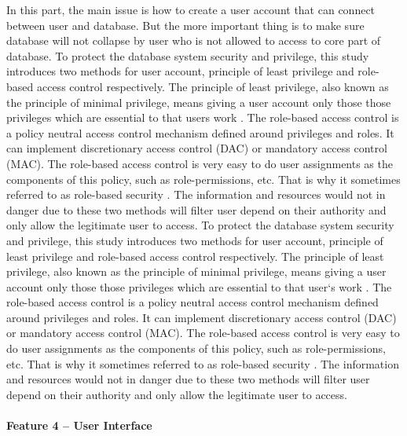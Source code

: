 In this part, the main issue is how to create a user account that can connect between user and database. But the more important thing is to make sure database will not collapse by user who is not allowed to access to core part of database.
To protect the database system security and privilege, this study introduces two methods for user account, principle of least privilege and role-based access control respectively. The principle of least privilege, also known as the principle of minimal privilege, means giving a user account only those those privileges which are essential to that users work \cite{PrincipleLeastPrivilege}. The role-based access control is a policy neutral access control mechanism defined around privileges and roles. It can implement discretionary access control (DAC) or mandatory access control (MAC). The role-based access control is very easy to do user assignments as the components of this policy, such as role-permissions, etc. That is why it sometimes referred to as role-based security \cite{RoleBasedAccessControl}. The information and resources would not in danger due to these two methods will filter user depend on their authority and only allow the legitimate user to access.	
To protect the database system security and privilege, this study introduces two methods for user account, principle of least privilege and role-based access control respectively. The principle of least privilege, also known as the principle of minimal privilege, means giving a user account only those those privileges which are essential to that user`s work \cite{PrincipleLeastPrivilege}. The role-based access control is a policy neutral access control mechanism defined around privileges and roles. It can implement discretionary access control (DAC) or mandatory access control (MAC). The role-based access control is very easy to do user assignments as the components of this policy, such as role-permissions, etc. That is why it sometimes referred to as role-based security \cite{RoleBasedAccessControl}. The information and resources would not in danger due to these two methods will filter user depend on their authority and only allow the legitimate user to access.
	
\paragraph*{Feature 4 -- User Interface}
\label{task1:feature4}
	
